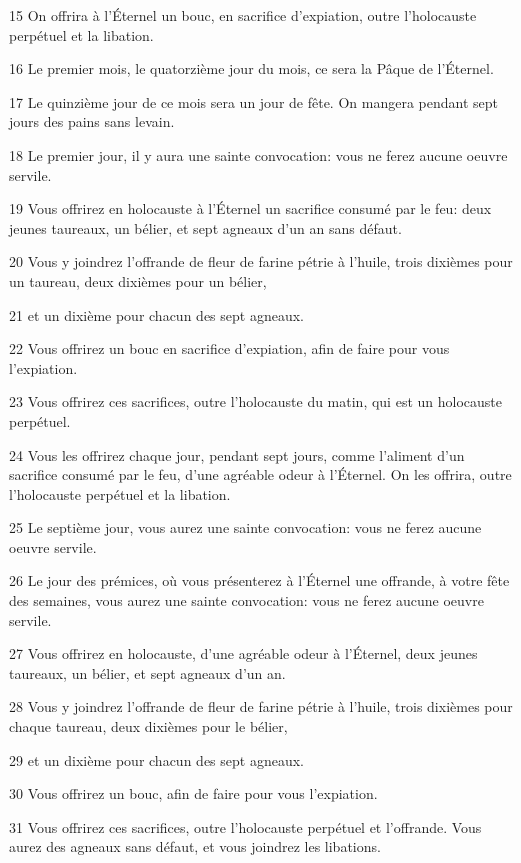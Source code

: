 \par 15 On offrira à l'Éternel un bouc, en sacrifice d'expiation, outre l'holocauste perpétuel et la libation.
\par 16 Le premier mois, le quatorzième jour du mois, ce sera la Pâque de l'Éternel.
\par 17 Le quinzième jour de ce mois sera un jour de fête. On mangera pendant sept jours des pains sans levain.
\par 18 Le premier jour, il y aura une sainte convocation: vous ne ferez aucune oeuvre servile.
\par 19 Vous offrirez en holocauste à l'Éternel un sacrifice consumé par le feu: deux jeunes taureaux, un bélier, et sept agneaux d'un an sans défaut.
\par 20 Vous y joindrez l'offrande de fleur de farine pétrie à l'huile, trois dixièmes pour un taureau, deux dixièmes pour un bélier,
\par 21 et un dixième pour chacun des sept agneaux.
\par 22 Vous offrirez un bouc en sacrifice d'expiation, afin de faire pour vous l'expiation.
\par 23 Vous offrirez ces sacrifices, outre l'holocauste du matin, qui est un holocauste perpétuel.
\par 24 Vous les offrirez chaque jour, pendant sept jours, comme l'aliment d'un sacrifice consumé par le feu, d'une agréable odeur à l'Éternel. On les offrira, outre l'holocauste perpétuel et la libation.
\par 25 Le septième jour, vous aurez une sainte convocation: vous ne ferez aucune oeuvre servile.
\par 26 Le jour des prémices, où vous présenterez à l'Éternel une offrande, à votre fête des semaines, vous aurez une sainte convocation: vous ne ferez aucune oeuvre servile.
\par 27 Vous offrirez en holocauste, d'une agréable odeur à l'Éternel, deux jeunes taureaux, un bélier, et sept agneaux d'un an.
\par 28 Vous y joindrez l'offrande de fleur de farine pétrie à l'huile, trois dixièmes pour chaque taureau, deux dixièmes pour le bélier,
\par 29 et un dixième pour chacun des sept agneaux.
\par 30 Vous offrirez un bouc, afin de faire pour vous l'expiation.
\par 31 Vous offrirez ces sacrifices, outre l'holocauste perpétuel et l'offrande. Vous aurez des agneaux sans défaut, et vous joindrez les libations.

